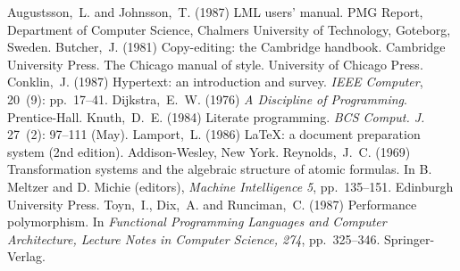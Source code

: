 \documentclass{jfp1}
\begin{document}
\begin{thebibliography}{}
   Augustsson,~L. and Johnsson,~T. (1987) LML users' manual. PMG
   Report, Department of Computer Science, Chalmers University of
   Technology, Goteborg, Sweden.
   Butcher,~J. (1981) Copy-editing: the Cambridge handbook.
   Cambridge University Press.
   The Chicago manual of style. University of Chicago Press.
   Conklin,~J. (1987) Hypertext: an introduction and survey.
   \emph{IEEE Computer}, 20~(9): pp.~17--41.
   Dijkstra,~E.~W. (1976) \emph{A Discipline of Programming}.
   Prentice-Hall.
   Knuth,~D.~E. (1984) Literate programming. \emph{BCS Comput. J.}
   27~(2): 97--111 (May).
   Lamport,~L. (1986) \LaTeX: a document preparation system
   (2nd edition). Addison-Wesley, New York.
   Reynolds,~J.~C. (1969) Transformation systems and the
   algebraic structure of atomic formulas. In B. Meltzer and
   D. Michie (editors), \emph{Machine Intelligence 5}, pp.~135--151.
   Edinburgh University Press.
   Toyn,~I., Dix,~A. and Runciman,~C. (1987) Performance
   polymorphism. In \emph{Functional Programming Languages and
   Computer Architecture, Lecture Notes in Computer Science, 274},
   pp.~325--346. Springer-Verlag.
\end{thebibliography}

\label{lastpage}
\end{document}
